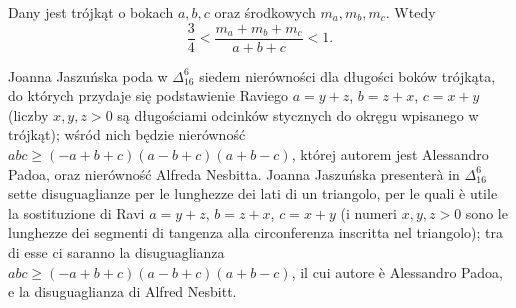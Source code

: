 
%


\begin{proposition}
    Dany jest trójkąt o bokach $a, b, c$ oraz środkowych $m_a, m_b, m_c$.
    Wtedy
    \begin{equation}
        \frac 3 4 < \frac{m_a + m_b + m_c}{a + b + c} < 1.
    \end{equation}
\end{proposition}

Joanna Jaszuńska poda w $\Delta_{16}^{6}$ siedem nierówności dla długości boków trójkąta, do których przydaje się podstawienie Raviego $a = y + z$, $b = z + x$, $c = x + y$ (liczby $x, y, z > 0$ są długościami odcinków stycznych do okręgu wpisanego w trójkąt); wśród nich będzie nierówność $abc \ge (-a + b + c)(a - b + c)(a + b - c)$, której autorem jest Alessandro Padoa, oraz nierówność Alfreda Nesbitta. %
Joanna Jaszuńska presenterà in $\Delta_{16}^{6}$ sette disuguaglianze per le lunghezze dei lati di un triangolo, per le quali è utile la sostituzione di Ravi $a = y + z$, $b = z + x$, $c = x + y$ (i numeri $x, y, z > 0$ sono le lunghezze dei segmenti di tangenza alla circonferenza inscritta nel triangolo); tra di esse ci saranno la disuguaglianza $abc \ge (-a + b + c)(a - b + c)(a + b - c)$, il cui autore è Alessandro Padoa, e la disuguaglianza di Alfred Nesbitt. %













%